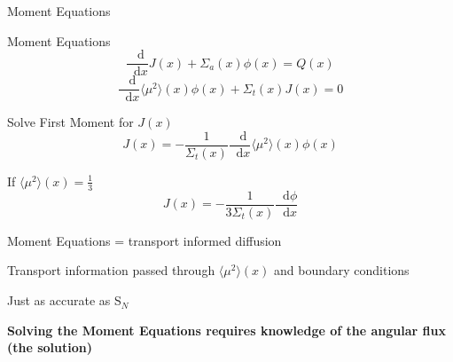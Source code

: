 \documentclass[10pt]{beamer}
\newcommand{\SN}{S$_N$\xspace}
\newcommand{\ud}{\mathop{}\!\mathrm{d}} %
\newcommand{\dderiv}[2]{\frac{\ud #1}{\ud #2}}
\newcommand{\edd}{\langle \mu^2 \rangle}
\begin{document}
\begin{frame}{Moment Equations}

	\footnotesize
	\begin{block}{Moment Equations}
	\begin{equation*}
		\dderiv{}{x} J(x) + \Sigma_a(x) \phi(x) = Q(x) \tag{\footnotesize Zeroth Moment}
	\end{equation*}
	\begin{equation*}
		\dderiv{}{x} \edd(x) \phi(x) 
		+ \Sigma_t(x) J(x) = 0 
        \tag{\footnotesize First Moment}
	\end{equation*}
	\end{block}

	\pause
	Solve First Moment for $J(x)$ 
	\begin{equation*}
		J(x) = -\frac{1}{\Sigma_t(x)} \dderiv{}{x} \edd(x) \phi(x)
	\end{equation*}

    \pause
    If $\edd(x) = \frac{1}{3}$
    \begin{equation*}
        J(x) = -\frac{1}{3\Sigma_t(x)} \dderiv{\phi}{x} \tag{Fick's Law}
    \end{equation*}

    \pause
    Moment Equations = transport informed diffusion

    \pause
    Transport information passed through $\edd(x)$ and boundary conditions

    \pause
    Just as accurate as \SN

    \pause
    \textbf{Solving the Moment Equations requires knowledge of the angular flux (the solution)}    


\end{frame}
\end{document}
